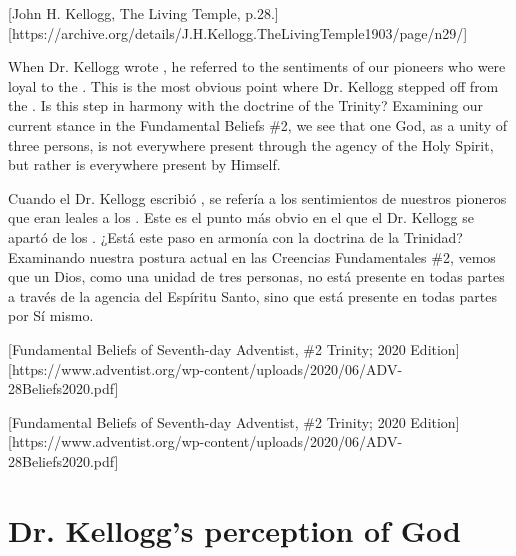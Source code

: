 [John H. Kellogg, The Living Temple, p.28.][https://archive.org/details/J.H.Kellogg.TheLivingTemple1903/page/n29/]


When Dr. Kellogg wrote , he referred to the sentiments of our pioneers who were loyal to the . This is the most obvious point where Dr. Kellogg stepped off from the . Is this step in harmony with the doctrine of the Trinity? Examining our current stance in the Fundamental Beliefs \#2, we see that one God, as a unity of three persons, is not everywhere present through the agency of the Holy Spirit, but rather is everywhere present by Himself.


Cuando el Dr. Kellogg escribió , se refería a los sentimientos de nuestros pioneros que eran leales a los . Este es el punto más obvio en el que el Dr. Kellogg se apartó de los . ¿Está este paso en armonía con la doctrina de la Trinidad? Examinando nuestra postura actual en las Creencias Fundamentales \#2, vemos que un Dios, como una unidad de tres personas, no está presente en todas partes a través de la agencia del Espíritu Santo, sino que está presente en todas partes por Sí mismo.


[Fundamental Beliefs of Seventh-day Adventist, \#2 Trinity; 2020 Edition][https://www.adventist.org/wp-content/uploads/2020/06/ADV-28Beliefs2020.pdf]


[Fundamental Beliefs of Seventh-day Adventist, \#2 Trinity; 2020 Edition][https://www.adventist.org/wp-content/uploads/2020/06/ADV-28Beliefs2020.pdf]


\section*{Dr. Kellogg's perception of God}



